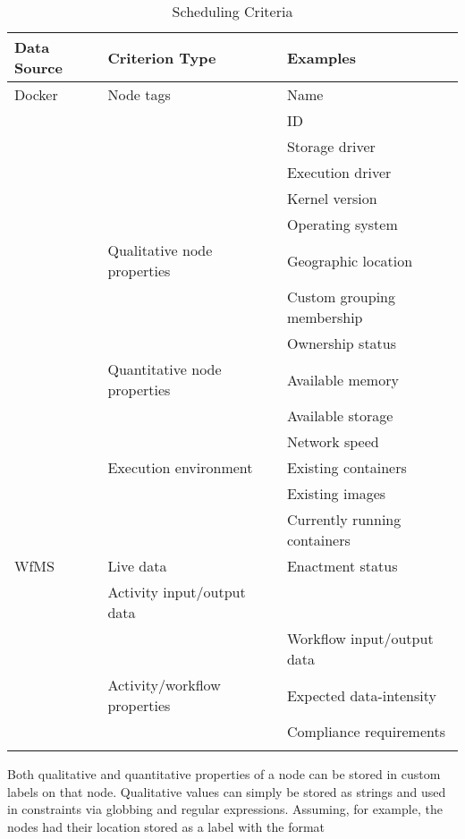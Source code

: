     \begin{table}[!htbp]
      \centering
      \begin{tabular}{l l l}
        \toprule
        Data Source & Criterion Type & Examples \\
        \midrule
        Docker
          & Node tags
            & Name \\
            && \ac{ID} \\
            && Storage driver \\
            && Execution driver \\
            && Kernel version  \\
            && Operating system \\ [1.2ex]
          & Qualitative node properties
            & Geographic location\\
            && Custom grouping membership\\
            && Ownership status\\ [1.2ex]
          & Quantitative node properties
            & Available memory \\
            && Available storage \\
            && Network speed \\ [1.2ex]
          & Execution environment
            & Existing containers \\
            && Existing images \\
            && Currently running containers \\ [1.4ex]
        WfMS
          & Live data
            & Enactment status \\
            & Activity input/output data \\
            && Workflow input/output data \\ [1.2ex]
          & Activity/workflow properties
            & Expected data-intensity \\
            && Compliance requirements\\
            &&\\ [1.2ex]
        \bottomrule
      \end{tabular}
      \label{tab:scheduling_criteria}
      \caption{Scheduling Criteria}
    \end{table}

    Both qualitative and quantitative properties of a node can be stored in custom labels on that node.
    Qualitative values can simply be stored as strings and used in constraints via globbing and regular expressions. Assuming, for example, the nodes had their location stored as a label with the format

